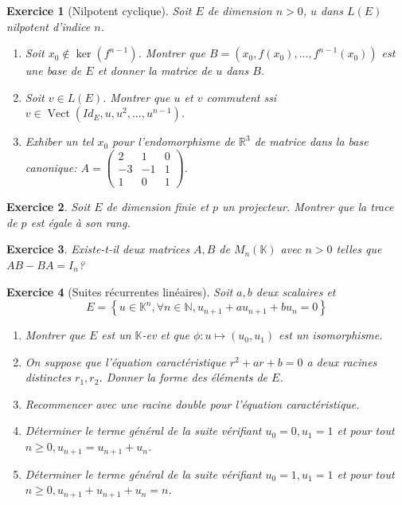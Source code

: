 \documentclass[12pt,a4paper]{article}
\newcommand{\R}{\mathbb{R}}
\newcommand{\N}{\mathbb{N}}
\newcommand{\K}{\mathbb{K} }
\DeclareMathOperator{\vect}{Vect}
\theoremstyle{break}
\theoremstyle{break}
\newtheorem{Exo}{Exercice}
\begin{document}
\begin{Exo}[Nilpotent cyclique]
	Soit $E$ de dimension $n>0$, $u$ dans $L(E)$ nilpotent d'indice $n$.
	\begin{enumerate}
		\item
		Soit $x_0\notin\ker(f^{n-1})$. Montrer que $B=\left(x_0,f(x_0),...,f^{n-1}(x_0)\right)$ est une base de $E$ et donner la matrice de $u$ dans $B$.
		\item
		Soit $v\in L(E)$. Montrer que $u$ et $v$ commutent ssi $v\in \vect\left(Id_E,u,u^2,...,u^{n-1}\right)$.
		\item
		Exhiber un tel $x_0$ pour l'endomorphisme de $\R^3$ de matrice dans la base canonique: $A=\left( \begin{matrix} 2& 1& 0\\ -3& -1& 1\\ 1& 0& 1\end{matrix} \right)$.
	\end{enumerate}
\end{Exo}

\begin{Exo}
	Soit $E$ de dimension finie et $p$ un projecteur. Montrer que la trace de $p$ est égale à son rang.
\end{Exo}

\begin{Exo}
	Existe-t-il deux matrices $A,B$ de $M_n(\K)$ avec $n>0$ telles que $AB-BA=I_n$?
\end{Exo}


\begin{Exo}[Suites récurrentes linéaires]
	Soit $a,b$ deux scalaires et $$E=\left\{u\in \K^n,\forall n\in \N,u_{n+1}+au_{n+1}+bu_n=0\right\}$$
	\begin{enumerate}
		\item
		Montrer que $E$ est un $\K$-ev et que $\phi:u\mapsto (u_0,u_1)$ est un isomorphisme.
		\item
		On suppose que l'équation caractéristique $r^2+ar+b=0$ a deux racines distinctes $r_1,r_2$. Donner la forme des éléments de $E$.
		\item Recommencer avec une racine double pour l'équation caractéristique.
		\item
		Déterminer le terme général de la suite vérifiant $u_0=0,u_1=1$ et pour tout $n\geqslant 0,u_{n+1}=u_{n+1}+u_n$.
		\item
		Déterminer le terme général de la suite vérifiant $u_0=1,u_1=1$ et pour tout $n\geqslant 0,u_{n+1}+u_{n+1}+u_n=n$.
	\end{enumerate}
\end{Exo}
\end{document}
